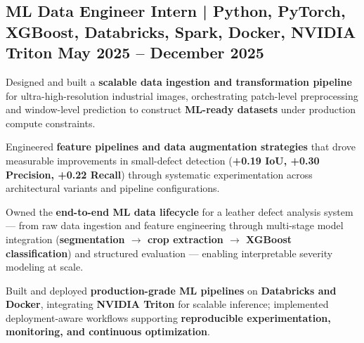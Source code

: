 
\subsection{{ML Data Engineer Intern |  Python, PyTorch, XGBoost, Databricks, Spark, Docker, NVIDIA Triton \hfill May 2025 -- December 2025}}
\begin{zitemize}
    \item Designed and built a \textbf{scalable data ingestion and transformation pipeline} for ultra-high-resolution industrial images, orchestrating patch-level preprocessing and window-level prediction to construct \textbf{ML-ready datasets} under production compute constraints.

    \item Engineered \textbf{feature pipelines and data augmentation strategies} that drove measurable improvements in small-defect detection (\textbf{+0.19 IoU, +0.30 Precision, +0.22 Recall}) through systematic experimentation across architectural variants and pipeline configurations.

    \item Owned the \textbf{end-to-end ML data lifecycle} for a leather defect analysis system — from raw data ingestion and feature engineering through multi-stage model integration (\textbf{segmentation $\rightarrow$ crop extraction $\rightarrow$ XGBoost classification}) and structured evaluation — enabling interpretable severity modeling at scale.

    \item Built and deployed \textbf{production-grade ML pipelines} on \textbf{Databricks and Docker}, integrating \textbf{NVIDIA Triton} for scalable inference; implemented deployment-aware workflows supporting \textbf{reproducible experimentation, monitoring, and continuous optimization}.
\end{zitemize}





